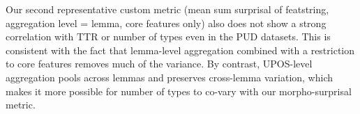 \documentclass[USenglish]{article}
\begin{document}
Our second representative custom metric (mean sum surprisal of featstring, aggregation level = lemma, core features only) also does not show a strong correlation with TTR or number of types even in the PUD datasets.
This is consistent with the fact that lemma-level aggregation combined with a restriction to core features  removes much of the variance.
By contrast, UPOS-level aggregation pools across lemmas and preserves cross-lemma variation, which makes it more possible for number of types to co-vary with our morpho-surprisal metric.
\end{document}
